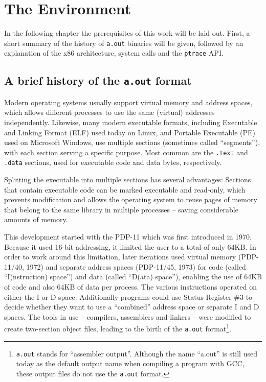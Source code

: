 \documentclass[draft,final]{vutinfth} %
\begin{document}
\chapter{The Environment}
\label{environment}

In the following chapter the prerequisites of this work will be laid out. First, a short summary of the history of \texttt{a.out} binaries will be given, followed by an explanation of the x86 architecture, system calls and the \texttt{ptrace} API.

\section{A brief history of the \texttt{a.out} format}
\label{history}

Modern operating systems usually support virtual memory and address spaces, which allows different processes to use the same (virtual) addresses independently. Likewise, many modern executable formats, including Executable and Linking Format (ELF)\cite{ElfManPage} used today on Linux, and Portable Executable (PE) used on Microsoft Windows, use multiple sections (sometimes called ``segments''), with each section serving a specific purpose. Most common are the \texttt{.text} and \texttt{.data} sections, used for executable code and data bytes, respectively.

Splitting the executable into multiple sections has several advantages\cite[page 50]{Levine}: Sections that contain executable code can be marked executable and read-only, which prevents modification and allows the operating system to reuse pages of memory that belong to the same library in multiple processes -- saving considerable amounts of memory.

This development started with the PDP-11 which was first introduced in 1970. Because it used 16-bit addressing, it limited the user to a total of only 64KB. In order to work around this limitation, later iterations used virtual memory (PDP-11/40, 1972\cite[page 6-2]{PDP1140Handbook}) and separate address spaces (PDP-11/45, 1973) for code (called ``I(nstruction) space'') and data (called ``D(ata) space'')\cite[page 145]{PDP1145Handbook}, enabling the use of 64KB of code and also 64KB of data per process. The various instructions operated on either the I or D space. Additionally programs could use Status Register \#3 to decide whether they want to use a ``combined'' address space or separate I and D spaces. The tools in use  -- compilers, assemblers and linkers -- were modified to create two-section object files, leading to the birth of the \texttt{a.out} format\footnote{\texttt{a.out} stands for ``assembler output''. Although the name ``a.out'' is still used today as the default output name when compiling a program with GCC, these output files do not use the \texttt{a.out} format.\cite{RitchieCLangDev}}.
\end{document}
